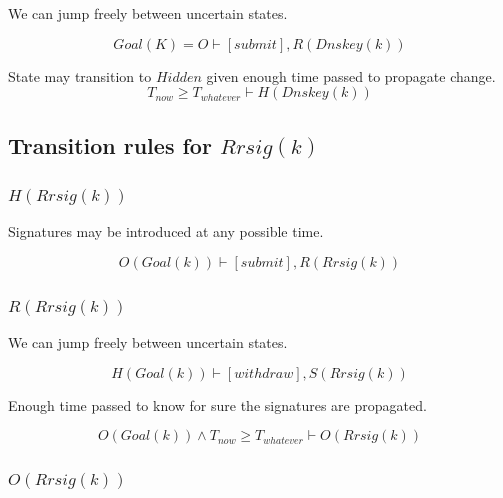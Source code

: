 \documentclass[twoside,english, a4paper]{article}
\newcommand{\mathbox}[1]{#1}
\begin{document}
\mathbox{

	We can jump freely between uncertain states.

	\begin{equation}
			Goal(K)=O \vdash [submit], R(Dnskey(k))
	\end{equation}

	State may transition to $Hidden$ given enough time passed to propagate 
	change. 
	\begin{equation}
			T_{now} \geq T_{whatever} \vdash H(Dnskey(k))
	\end{equation}
}

\subsection{Transition rules for $Rrsig(k)$}

\subsubsection{$H(Rrsig(k))$}

\mathbox{
	Signatures may be introduced at any possible time.

	\begin{equation}
			O(Goal(k)) \vdash [submit], R(Rrsig(k))
	\end{equation}
}

\subsubsection{$R(Rrsig(k))$}

\mathbox{

	We can jump freely between uncertain states.
	
	\begin{equation}
		H(Goal(k)) \vdash [withdraw], S(Rrsig(k))
	\end{equation}

	Enough time passed to know for sure the signatures are propagated.
	
	\begin{equation}
		O(Goal(k)) \wedge T_{now} \geq T_{whatever} \vdash O(Rrsig(k))
	\end{equation}
}


\subsubsection{$O(Rrsig(k))$}
\end{document}
